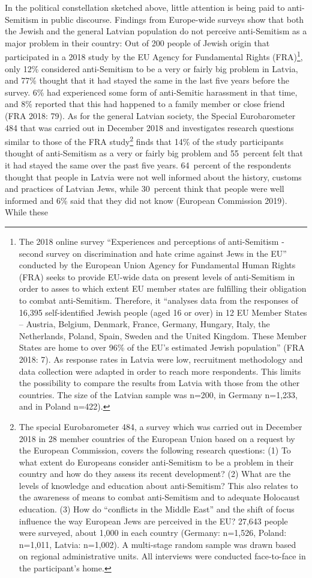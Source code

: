 In the political constellation sketched above, little attention is being paid to anti-Semitism in public discourse. Findings from Europe-wide surveys show that both the Jewish and the general Latvian population do not perceive anti-Semitism as a major problem in their country: Out of 200 people of Jewish origin that participated in a 2018 study by the EU Agency for Fundamental Rights (FRA)\footnote{The 2018 online survey ``Experiences and perceptions of anti-Semitism - second survey on discrimination and hate crime against Jews in the EU'' conducted by the European Union Agency for Fundamental Human Rights (FRA) seeks to provide EU-wide data on present levels of anti-Semitism in order to asses to which extent EU member states are fulfilling their obligation to combat anti-Semitism. Therefore, it ``analyses data from the responses of 16,395 self-identified Jewish people (aged 16 or over) in 12 EU Member States – Austria, Belgium, Denmark, France, Germany, Hungary, Italy, the Netherlands, Poland, Spain, Sweden and the United Kingdom. These Member States are home to over 96\% of the EU’s estimated Jewish population'' (FRA 2018: 7). As response rates in Latvia were low, recruitment methodology and data collection were adapted in order to reach more respondents. This limits the possibility to compare the results from Latvia with those from the other countries. The size of the Latvian sample was n=200, in Germany n=1,233, and in Poland n=422).}, only 12\% considered anti-Semitism to be a very or fairly big problem in Latvia, and 77\% thought that it had stayed the same in the last five years before the survey. 6\% had experienced some form of anti-Semitic harassment in that time, and 8\% reported that this had happened to a family member or close friend (FRA 2018: 79). As for the general Latvian society, the Special Eurobarometer 484 that was carried out in December 2018 and investigates research questions similar to those of the FRA study\footnote{The special Eurobarometer 484, a survey which was carried out in December 2018 in 28 member countries of the European Union based on a request by the European Commission, covers the following research questions: (1) To what extent do Europeans consider anti-Semitism to be a problem in their country and how do they assess its recent development? (2) What are the levels of knowledge and education about anti-Semitism? This also relates to the awareness of means to combat anti-Semitism and to adequate Holocaust education. (3) How do ``conflicts in the Middle East'' and the shift of focus influence the way European Jews are perceived in the EU? 27,643 people were surveyed, about 1,000 in each country (Germany: n=1,526, Poland: n=1,011, Latvia: n=1,002). A multi-stage random sample was drawn based on regional administrative units. All interviews were conducted face-to-face in the participant’s home.} finds that 14\% of the study participants thought of anti-Semitism as a very or fairly big problem and 55\ percent felt that it had stayed the same over the past five years. 64\ percent of the respondents thought that people in Latvia were not well informed about the history, customs and practices of Latvian Jews, while 30\ percent think that people were well informed and 6\% said that they did not know (European Commission 2019). While these 